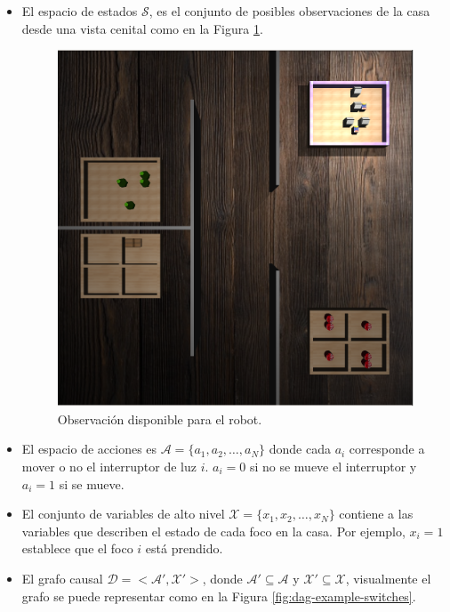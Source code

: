  \begin{itemize}
     \item El espacio de estados $\mathcal{S}$, es el conjunto de
     posibles observaciones de la casa desde una vista cenital como en la Figura
   \ref{fig:obs-switches}.
     \begin{figure}[H]
         \centering
         \includegraphics[scale=0.17]{Chapter4/Figs/example_obs.png}
         \caption{Observación disponible para el robot.}
         \label{fig:obs-switches}
     \end{figure}
     \item El espacio de acciones es $\mathcal{A} = \{a_1, a_2, \dots, a_N\}$
     donde cada $a_i$ corresponde a mover o no el interruptor de luz $i$. $a_i = 0$ si no se mueve el interruptor y $a_i = 1$ si se mueve.
     \item El conjunto de variables de alto nivel $\mathcal{X} = \{x_1, x_2, \dots, x_N\}$ contiene
     a las variables que describen el estado de cada foco en la casa. Por ejemplo, $x_i = 1$ establece que el foco $i$ está prendido.
     \item El grafo causal $\mathcal{D} = <\mathcal{A'}, \mathcal{X'}>$, donde
     $\mathcal{A'} \subseteq \mathcal{A}$ y $\mathcal{X'} \subseteq \mathcal{X}$, visualmente el grafo se puede representar como en la Figura \ref{fig:dag-example-switches}.
     

\end{itemize}
